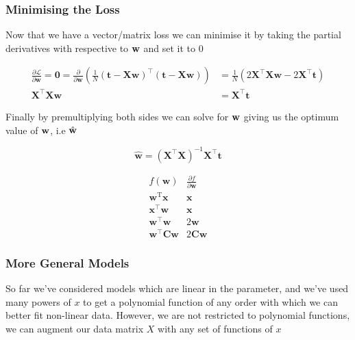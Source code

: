 		\subsubsection{Minimising the Loss}

			\par{Now that we have a vector/matrix loss we can minimise it by taking the partial derivatives with respective to $\mathbf{w}$ and set it to $0$}

			$$\begin{aligned} \frac{\partial \mathcal{L}}{\partial \mathbf{w}}=\mathbf{0} = \frac{\partial}{\partial \mathbf{w}}\left(\frac{1}{N}(\mathbf{t}-\mathbf{X} \mathbf{w})^{\top}(\mathbf{t}-\mathbf{X} \mathbf{w})\right) &=\frac{1}{N}\left(2 \mathbf{X}^{\top} \mathbf{X} \mathbf{w}-2 \mathbf{X}^{\top} \mathbf{t}\right) \\ \mathbf{X}^{\top} \mathbf{X} \mathbf{w} &=\mathbf{X}^{\top} \mathbf{t} \end{aligned}$$

			\par{Finally by premultiplying both sides we can solve for $\mathbf{w}$ giving us the optimum value of $\mathbf{w}$, i.e $\hat{\mathbf{w}}$}

			$$\widehat{\mathbf{w}}=\left(\mathbf{X}^{\top} \mathbf{X}\right)^{-1} \mathbf{X}^{\top} \mathbf{t}$$


			$$\begin{array}{c|c}f(\mathbf{w}) & \frac{\partial f}{\partial \mathbf{w}} \\ \hline \mathbf{w}^{\mathrm{T}} \mathbf{x} & \mathbf{x} \\ \mathbf{x}^{\top} \mathbf{w} & \mathbf{x} \\ \mathbf{w}^{\top} \mathbf{w} & 2 \mathbf{w} \\ \mathbf{w}^{\top} \mathbf{C} \mathbf{w} & 2 \mathbf{C} \mathbf{w}\end{array}$$


		\subsubsection{More General Models}


		\par{So far we've considered models which are linear in the parameter, and we've used many powers of $x$ to get a polynomial function of any order with which we can better fit non-linear data. However, we are not restricted to polynomial functions, we can augment our data matrix $X$ with any set of functions of $x$}

